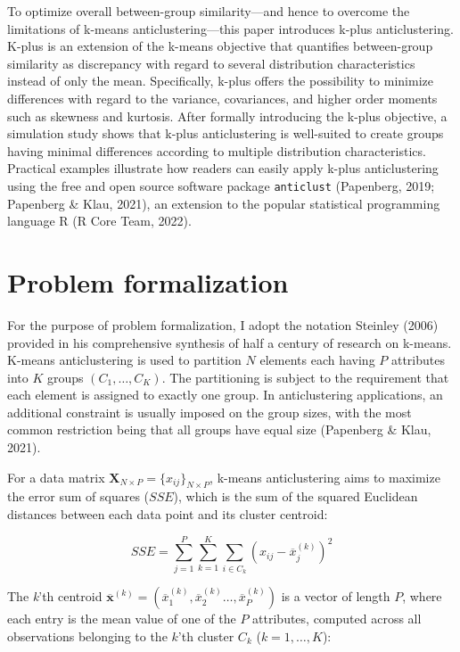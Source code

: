 \documentclass[
  man,floatsintext]{apa7}
\begin{document}
To optimize overall between-group similarity---and hence to overcome the limitations of k-means anticlustering---this paper introduces k-plus anticlustering. K-plus is an extension of the k-means objective that quantifies between-group similarity as discrepancy with regard to several distribution characteristics instead of only the mean. Specifically, k-plus offers the possibility to minimize differences with regard to the variance, covariances, and higher order moments such as skewness and kurtosis. After formally introducing the k-plus objective, a simulation study shows that k-plus anticlustering is well-suited to create groups having minimal differences according to multiple distribution characteristics. Practical examples illustrate how readers can easily apply k-plus anticlustering using the free and open source software package \texttt{anticlust} (Papenberg, 2019; Papenberg \& Klau, 2021), an extension to the popular statistical programming language R (R Core Team, 2022).

\hypertarget{problem-formalization}{%
\section{Problem formalization}\label{problem-formalization}}

For the purpose of problem formalization, I adopt the notation Steinley (2006) provided in his comprehensive synthesis of half a century of research on k-means. K-means anticlustering is used to partition \(N\) elements each having \(P\) attributes into \(K\) groups \((C_1, \ldots, C_K)\). The partitioning is subject to the requirement that each element is assigned to exactly one group. In anticlustering applications, an additional constraint is usually imposed on the group sizes, with the most common restriction being that all groups have equal size (Papenberg \& Klau, 2021).

For a data matrix \(\mathbf{X}_{N \times P} = \{x_{ij}\}_{N \times P}\), k-means anticlustering aims to maximize the error sum of squares (\(\mathit{SSE}\)), which is the sum of the squared Euclidean distances between each data point and its cluster centroid:

\[
\mathit{SSE} = 
  \sum\limits_{j=1}^{P} 
  \sum\limits_{k=1}^{K} 
  \sum\limits_{i \in C_k}
  (x_{ij} - \overline{x}_j ^{(k)})^2
\]

The \emph{k}'th centroid \(\overline{\mathbf{x}}^{(k)} = (\overline{x}_1^{(k)}, \overline{x}_2^{(k)} \ldots, \overline{x}_P^{(k)})\) is a vector of length \(P\), where each entry is the mean value of one of the \(P\) attributes, computed across all observations belonging to the \(k\)'th cluster \(C_k\) (\(k = 1, \ldots, K\)):
\end{document}
